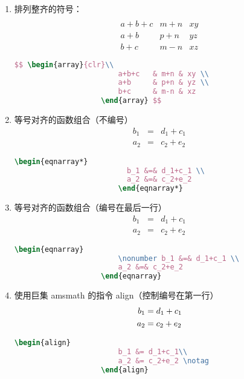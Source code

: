 \begin{enumerate}
  \item 排列整齐的符号：
        $$ \begin{array}{clr}\\
            a+b+c   & m+n & xy \\
            a+b     & p+n & yz \\
            b+c     & m-n & xz
        \end{array} $$
\begin{lstlisting}[language=TeX,numbers=none,frame=lrtb,keywords={begin}]
					$$ \begin{array}{clr}\\
						a+b+c   & m+n & xy \\
						a+b     & p+n & yz \\
						b+c     & m-n & xz
					\end{array} $$
\end{lstlisting}

    \item 等号对齐的函数组合（不编号）
        \begin{eqnarray*}
          b_1 &=& d_1+c_1 \\
          a_2 &=& c_2+e_2
        \end{eqnarray*}
\begin{lstlisting}[language=TeX,numbers=none,frame=lrtb,keywords={begin}]
						\begin{eqnarray*}
						  b_1 &=& d_1+c_1 \\
						  a_2 &=& c_2+e_2
						\end{eqnarray*}
\end{lstlisting}

    \item 等号对齐的函数组合（编号在最后一行）
        \begin{eqnarray}
\nonumber b_1 &=& d_1+c_1 \\
          a_2 &=& c_2+e_2
        \end{eqnarray}
\begin{lstlisting}[language=TeX,numbers=none,frame=lrtb,keywords={begin}]
					\begin{eqnarray}
						\nonumber b_1 &=& d_1+c_1 \\
						a_2 &=& c_2+e_2
					\end{eqnarray}
\end{lstlisting}

    \item 使用巨集 amsmath 的指令 align（控制编号在第一行）
        \begin{align}
            b_1 &= d_1+c_1\\
            a_2 &= c_2+e_2 \notag
        \end{align}
\begin{lstlisting}[language=TeX,numbers=none,frame=lrtb,keywords={begin}]
					\begin{align}
						b_1 &= d_1+c_1\\
						a_2 &= c_2+e_2 \notag
					\end{align}
\end{lstlisting}


\end{enumerate}
